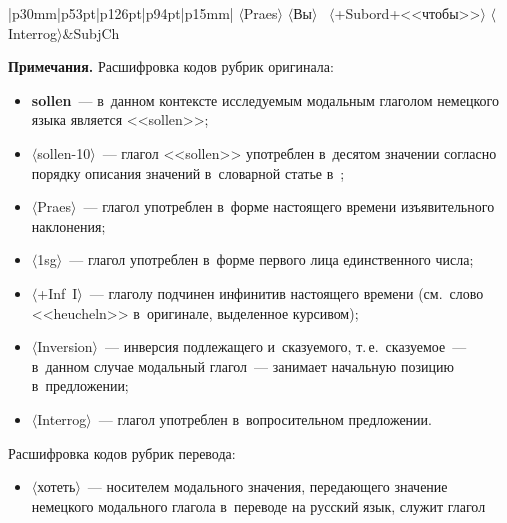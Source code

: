 \begin{table*}
\begin{center}
\begin{tabular}{|p{30mm}|p{53pt}|p{126pt}|p{94pt}|p{15mm}|}
{{}}
$\langle$Praes$\rangle$\newline
{}
$\langle$Вы$\rangle$\newline
\mbox{~$\langle$+Subord\;+\;<<чтобы>>$\rangle$}\newline 
{}
$\langle$Interrog$\rangle$&SubjCh\\
\hline
{} %
{\footnotesize \textbf{Примечания.}\newline
Расшифровка кодов рубрик оригинала:\newline
\vspace*{-9pt}
\begin{itemize}
\addtolength{\itemsep}{-3pt}
\item \textbf{sollen}~--- в~данном контексте исследуемым модальным глаголом 
немецкого языка является <<sollen>>;
\item $\langle$sollen-10$\rangle$~--- глагол <<sollen>> употреблен в~десятом 
значении согласно порядку описания значений в~словарной статье в~\cite{13-gon};
\item $\langle$Praes$\rangle$~--- глагол употреблен в~форме настоящего времени 
изъявительного наклонения;
\item $\langle$1sg$\rangle$~--- глагол употреблен в~форме первого лица 
единственного числа;
\item $\langle$+Inf~I$\rangle$~--- глаголу подчинен инфинитив настоящего времени 
(см.\ слово <<heucheln>> в~оригинале, выделенное курсивом);
\item $\langle$Inversion$\rangle$~--- инверсия подлежащего и~сказуемого, т.\,е.\ 
сказуемое~--- в~данном случае модальный глагол~--- занимает начальную позицию 
в~предложении;
\item $\langle$Interrog$\rangle$~--- глагол употреблен в~вопросительном 
предложении.
\end{itemize}
%
Расшифровка кодов рубрик перевода:
\begin{itemize}
\addtolength{\itemsep}{-3pt}
\item {}
 $\langle$хотеть$\rangle$~--- носителем модального значения, передающего 
значение немецкого модального глагола в~переводе на русский язык, служит глагол 

\end{itemize}}
\end{tabular}
\end{center}
\end{table*}
